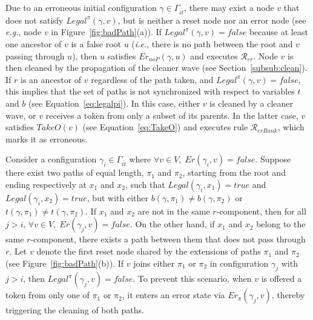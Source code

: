 \documentclass[a4paper, 12pt]{article}
\newcommand{\Rer}{$\mathscr{R}_{er}$}
\newcommand{\RerRank}{$\mathscr{R}_{erRank}$}
\begin{document}
Due to an erroneous initial configuration $\gamma \in \Gamma_{\bar{it}}$, 
there may exist a node $v$ that does not satisfy $Legal^\pi(\gamma, v)$, 
but is neither a reset node nor an error node (see \textit{e.g.}, node 
$v$ in Figure~\ref{fig:badPath}(a)). If $Legal^\pi(\gamma, v) = 
\mathit{false}$ because at least one ancestor of $v$ is a false root $u$ 
(\textit{i.e.}, there is no path between the root and $v$ passing through 
$u$), then $u$ satisfies $\mathit{Er_{noP}}(\gamma, u)$ and executes \Rer. 
Node $v$ is then cleaned by the propagation of the cleaner wave (see 
Section~\ref{subsub:clean}). If $r$ is an ancestor of $v$ regardless of 
the path taken, and $Legal^\pi(\gamma, v) = \mathit{false}$, this implies 
that the set of paths is not synchronized with respect to variables $t$ 
and $b$ (see Equation~\ref{eq:legalpi}). In this case, either $v$ is 
cleaned by a cleaner wave, or $v$ receives a token from only a subset of 
its parents. In the latter case, $v$ satisfies $\mathit{TakeO}(v)$ 
(see Equation~\ref{eq:TakeO}) and executes rule \RerRank, which marks 
it as erroneous.

Consider a configuration $\gamma_i \in \Gamma_{\bar{it}}$ where 
$\forall v \in V,\; Er(\gamma_i, v) = \mathit{false}$. Suppose there 
exist two paths of equal length, $\pi_1$ and $\pi_2$, starting from the 
root and ending respectively at $x_1$ and $x_2$, such that 
$Legal(\gamma_i, x_1) = \mathit{true}$ and 
$Legal(\gamma_i, x_2) = \mathit{true}$, but with either 
$b(\gamma, \pi_1) \neq b(\gamma, \pi_2)$ or 
$t(\gamma, \pi_1) \neq t(\gamma, \pi_2)$. If $x_1$ and $x_2$ are not 
in the same $r$-component, then for all $j > i$, 
$\forall v \in V,\; Er(\gamma_j, v) = \mathit{false}$. On the other 
hand, if $x_1$ and $x_2$ belong to the same $r$-component, there exists 
a path between them that does not pass through $r$. Let $v$ denote the 
first reset node shared by the extensions of paths $\pi_1$ and $\pi_2$ 
(see Figure~\ref{fig:badPath}(b)). If $v$ joins either $\pi_1$ or 
$\pi_2$ in configuration $\gamma_j$ with $j > i$, then 
$Legal^\pi(\gamma_j, v) = \mathit{false}$. To prevent this scenario, 
when $v$ is offered a token from only one of $\pi_1$ or $\pi_2$, it 
enters an error state via $Er_\pi(\gamma_j, v)$, thereby triggering the 
cleaning of both paths.
\end{document}
